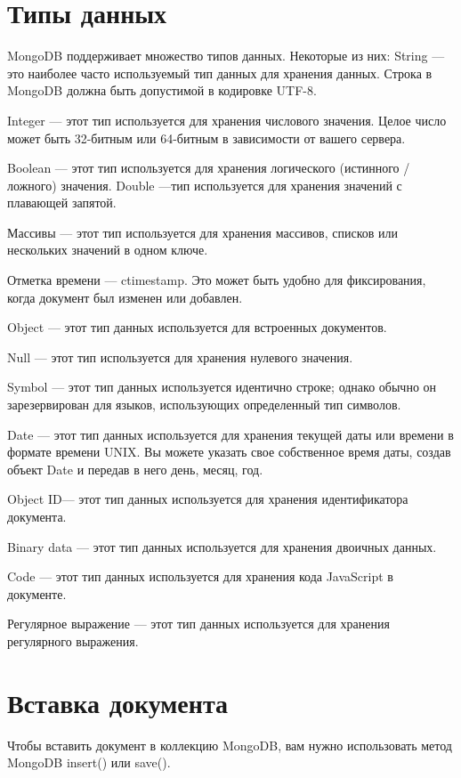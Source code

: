 \section{Типы данных}
MongoDB поддерживает множество типов данных.
Некоторые из них:
String — это наиболее часто используемый тип данных для хранения
данных. Строка в MongoDB должна быть допустимой в кодировке UTF-8.\par
Integer — этот тип используется для хранения числового значения. Целое
число может быть 32-битным или 64-битным в зависимости от вашего сервера.\par
Boolean — этот тип используется для хранения логического (истинного /
ложного) значения.
Double —тип используется для хранения значений с плавающей запятой.\par
Массивы — этот тип используется для хранения массивов, списков или
нескольких значений в одном ключе.\par
Отметка времени — ctimestamp. Это может быть удобно для
фиксирования, когда документ был изменен или добавлен.\par
Object — этот тип данных используется для встроенных документов.\par
Null — этот тип используется для хранения нулевого значения.\par
Symbol — этот тип данных используется идентично строке; однако
обычно он зарезервирован для языков, использующих определенный тип
символов.\par
Date — этот тип данных используется для хранения текущей даты или
времени в формате времени UNIX. Вы можете указать свое собственное время
даты, создав объект Date и передав в него день, месяц, год.\par
Object ID— этот тип данных используется для хранения идентификатора
документа.\par
Binary data — этот тип данных используется для хранения двоичных
данных.\par
Code — этот тип данных используется для хранения кода JavaScript в
документе.\par
Регулярное выражение — этот тип данных используется для хранения
регулярного выражения.\par

\clearpage
\section{Вставка документа}

Чтобы вставить документ в коллекцию MongoDB, вам нужно
использовать метод MongoDB insert() или save().

